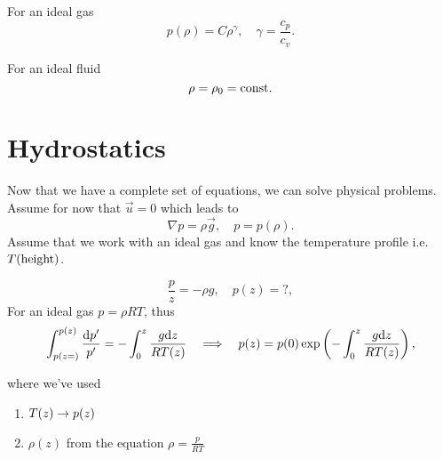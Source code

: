 \documentclass[../main.tex]{subfiles}
\begin{document}
    For an ideal gas
    \begin{displaymath}
      p(\rho) = C \rho ^\gamma, \quad \gamma = \frac{c_p}{c_v}.
    \end{displaymath}

    For an ideal fluid
    \begin{displaymath}
      \rho = \rho_0 = \textrm{const}.
    \end{displaymath}

    \section{Hydrostatics}
    Now that we have a complete set of equations, we can solve physical problems.
    Assume for now that $\vec u = 0$ which leads to 
    \begin{displaymath}
      \nabla p = \rho \vec g, \quad p = p(\rho).
    \end{displaymath}
    Assume that we work with an ideal gas and know the temperature profile i.e. $T(\textrm{height})$.
    
    \begin{figure}[h]
      \centering
    \end{figure}

    
    \begin{displaymath}
      \dfrac{p}{z} = - \rho g, \quad p(z) = ?,
    \end{displaymath}
    For an ideal gas $p = \rho R T$, thus
    \begin{displaymath}
      \int_{p(z = )}^{p(z)} \frac{\mathrm{d} p'}{p'} = - \int_0^z \frac{g \mathrm{d} z}{RT(z)} 
      \quad \Longrightarrow \quad p(z) = p(0) \exp\left( -\int_0^z \frac{g \mathrm{d} z}{RT(z)} \right),
    \end{displaymath}

    where we've used 
    \begin{enumerate}
      \item $T(z) \rightarrow p(z)$
      \item $\rho(z)$ from the equation $\rho=  \frac{p}{RT}$
    \end{enumerate}
\end{document}
